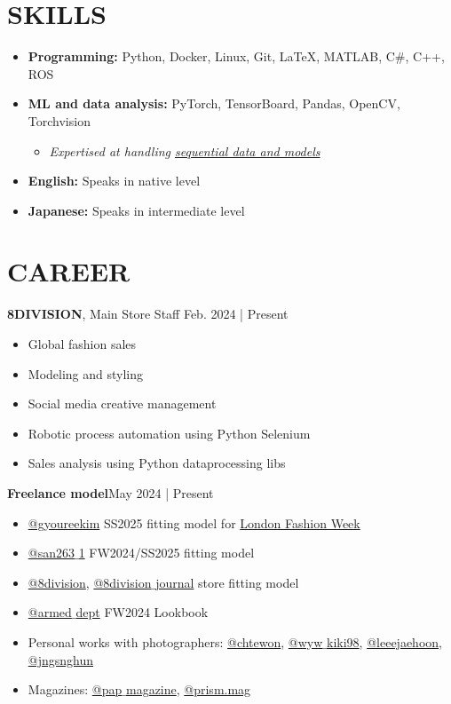 \documentclass[a4paper,10pt]{extarticle}
\begin{document}
\section*{SKILLS}
\begin{itemize}
	\item \textbf{Programming: }Python, Docker, Linux, Git, \LaTeX, MATLAB, C\#, C++, ROS
	\item \textbf{ML and data analysis:} PyTorch, TensorBoard, Pandas, OpenCV, Torchvision
	      \begin{itemize}
		      \item \textit{Expertised at handling \underline{sequential data and models}}
	      \end{itemize}
	\item \textbf{English: }Speaks in native level
	\item \textbf{Japanese: }Speaks in intermediate level
\end{itemize}

\section*{CAREER}
\noindent
\textbf{8DIVISION}, Main Store Staff \hfill Feb. 2024 | Present
\begin{itemize}
	\item Global fashion sales
	\item Modeling and styling
	\item Social media creative management
	\item Robotic process automation using Python Selenium
	\item Sales analysis using Python dataprocessing libs
\end{itemize}
\textbf{Freelance model}\hfill May 2024 | Present
\begin{itemize}
    \item \href{https://instagram.com/gyoureekim}{@gyoureekim} SS2025 fitting model for \href{https://instagram.com/londonfashionweek}{London Fashion Week}
    \item \href{https://instagram.com/san263_1}{@san263$\_$1} FW2024/SS2025 fitting model
    \item \href{https://instagram.com/8division}{@8division}, \href{https://instagram.com/8division_journal}{@8division$\_$journal} store fitting model
	\item \href{https://instagram.com/armed_dept}{@armed$\_$dept} FW2024 Lookbook
	\item Personal works with photographers: \href{https://instagram.com/chtewon}{@chtewon}, \href{https://instagram.com/wyw_kiki98}{@wyw$\_$kiki98}, \href{https://instagram.com/leeejaehoon}{@leeejaehoon}, \href{https://instagram.com/jngsnghun}{@jngsnghun}
	\item Magazines: \href{https://instagram.com/pap_magazine}{@pap$\_$magazine}, \href{https://instagram.com/prism.mag}{@prism.mag}
\end{itemize}
\end{document}
